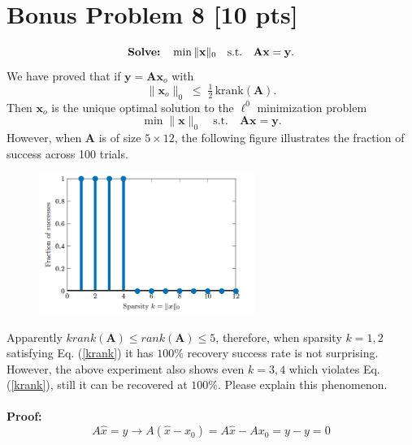 \documentclass[11pt]{article}
\newcommand{\mtx}[1]{\mathbf{#1}}
\newcommand{\vct}[1]{\mathbf{#1}}
\def \mA {\mtx{A}}
\def \vx {\vct{x}}
\def \vy {\vct{y}}
\begin{document}
\section*{Bonus Problem 8 [10 pts]}
\begin{equation}
	\text{\bf Solve:} \quad \min \|\vx\|_{0} \quad \mbox{s.t.}\quad { \mA \vx = \vy. }
\end{equation}
We have proved that if $\vy = \mA \vx_o$ with
\begin{equation}\label{krank}
	\|\vx_o\|_0 \; \le \; \tfrac{1}{2} \, \mathrm{krank}(\mA).
\end{equation}
Then $\vx_o$ is the unique optimal solution to the  $\ell^0$ minimization problem
\begin{equation}
	\min \|\vx\|_{0} \quad \mbox{s.t.}\quad { \mA \vx = \vy. }
\end{equation}
However, when $\mA$ is of size $5 \times 12$, the following figure illustrates the fraction of success across 100 trials.
\begin{figure}[h!]
	\centering
	\includegraphics[width=7cm]{simulation-L0.png}
\end{figure}    
Apparently $krank(\mA)\le rank(\mA)\le 5$, therefore, when sparsity $k=1, 2$ satisfying Eq. (\ref{krank}) it has $100\%$ recovery success rate is not surprising. However, the above experiment also shows even $k=3, 4$ which violates Eq. (\ref{krank}), still it can be recovered at $100\%$. Please explain this phenomenon.\\\\
\textbf{Proof:}
\begin{equation}
A\hat{x} = y \rightarrow A(\hat{x} - x_0) = A\hat{x} - Ax_0 = y - y = 0
\end{equation}\\\\
\end{document}
